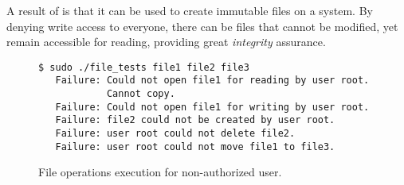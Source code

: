 \par A result of  is that it can be used to create immutable files on a system. By denying write access to everyone, there can be files that cannot be modified, yet remain accessible for reading, providing great \emph{integrity} assurance.

\begin{figure}[ht]
	\centering
	\footnotesize{\selectfont 
		\begin{lstlisting}
$ sudo ./file_tests file1 file2 file3
   Failure: Could not open file1 for reading by user root. 
            Cannot copy.
   Failure: Could not open file1 for writing by user root.
   Failure: file2 could not be created by user root.
   Failure: user root could not delete file2.
   Failure: user root could not move file1 to file3.

		\end{lstlisting}}
	\caption{File operations execution for non-authorized user.}
	\label{fig:results2}
\end{figure}




